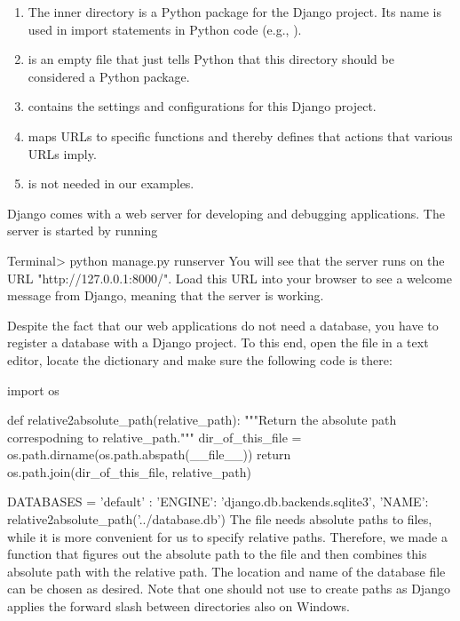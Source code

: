 \documentclass[%
oneside,                 %
final,                   %
10pt]{article}
\begin{document}
{{\begin{enumerate}
  \item The inner  directory is a Python package for the Django project. Its name is used in import statements in Python code (e.g., ).

  \item {} is an empty file that just tells Python that this directory should be considered a Python package.

  \item {} contains the settings and configurations for this Django project.

  \item {} maps URLs to specific functions and thereby defines that actions that various URLs imply.

  \item {} is not needed in our examples.
\end{enumerate}

\noindent
Django comes with a web server for developing and debugging applications.
The server is started by running

\bsys
Terminal> python manage.py runserver
\esys
You will see that the server runs on the URL "http://127.0.0.1:8000/".
Load this URL into your browser to see a welcome message from Django,
meaning that the server is working.

Despite the fact that our web applications do not need a database, you
have to register a database with a Django project. To this end,
open the  file in a text editor,
locate the  dictionary and make sure the following
code is there:

\bpycod
import os

def relative2absolute_path(relative_path):
    """Return the absolute path correspodning to relative_path."""
    dir_of_this_file = os.path.dirname(os.path.abspath(__file__))
    return os.path.join(dir_of_this_file, relative_path)

DATABASES = {
   'default' : {
      'ENGINE': 'django.db.backends.sqlite3',
      'NAME': relative2absolute_path('../database.db')
   }
}
\epycod
The  file needs absolute paths to files, while it is
more convenient for us to specify relative paths. Therefore,
we made a function that figures out the absolute path to the 
file and then combines this absolute path with the relative path.
The location and name of the database file can be chosen as desired.
Note that one should not use  to create paths as Django
applies the forward slash between directories also on Windows.


}}
\end{document}
